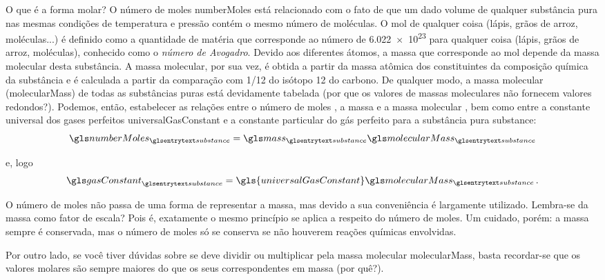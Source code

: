     O que é a forma molar? O número de moles \gls{numberMoles} está relacionado
    com o fato de que um dado volume de qualquer substância pura nas mesmas
    condições de temperatura e pressão contém o mesmo número de moléculas. O
    mol de qualquer coisa (lápis, grãos de arroz, moléculas...) é definido como
    a quantidade de matéria que corresponde ao número de \num{6.022e23} para
    qualquer coisa (lápis, grãos de arroz, moléculas), conhecido como o
    \emph{número de Avogadro}. Devido aos diferentes átomos, a massa que
    corresponde ao mol depende da massa molecular desta substância. A massa
    molecular, por sua vez, é obtida a partir da massa atômica dos
    constituintes da composição química da substância e é  calculada a partir
    da comparação com 1/12 do isótopo 12 do carbono. De qualquer modo, a massa
    molecular (\gls{molecularMass}) de todas as substâncias puras está
    devidamente tabelada (por que os valores de massas moleculares não fornecem
    valores redondos?). Podemos, então, estabelecer as relações entre o número
    de moles , a massa  e a
    massa molecular , bem como entre a constante
    universal dos gases perfeitos \gls{universalGasConstant} e a constante
    particular do gás perfeito  para a substância
    pura \gls{substance}:
	\begin{equation} \label{eq:1.6}
       \gsub{numberMoles}{substance}
       =
       \gsub{mass}{substance}
       \gsub{molecularMass}{substance}
    \end{equation}

    e, logo
	\begin{equation} \label{eq:gasConstant}
       \gsub{gasConstant}{substance}
       =
       \gls{universalGasConstant}
       \gsub{molecularMass}{substance}\,.
    \end{equation}

    O número de moles não passa de uma forma de representar a massa, mas devido
    a sua conveniência é largamente utilizado. Lembra-se da massa como fator de
    escala? Pois é, exatamente o mesmo princípio se aplica a respeito do número
    de moles. Um cuidado, porém: a massa sempre é conservada, mas o número de
    moles só se conserva se não houverem reações químicas envolvidas.

    Por outro lado, se você tiver dúvidas sobre se deve dividir ou multiplicar
    pela massa molecular \gls{molecularMass}, basta recordar-se que os valores
    molares são sempre maiores do que os seus correspondentes em massa (por
    quê?).

